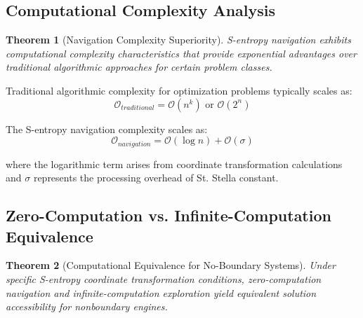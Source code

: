 \documentclass[11pt,a4paper]{article}
\newtheorem{theorem}{Theorem}[section]
\theoremstyle{remark}
\begin{document}
\subsection{Computational Complexity Analysis}

\begin{theorem}[Navigation Complexity Superiority]
S-entropy navigation exhibits computational complexity characteristics that provide exponential advantages over traditional algorithmic approaches for certain problem classes.
\end{theorem}

Traditional algorithmic complexity for optimization problems typically scales as:
\begin{equation}
\mathcal{O}_{traditional} = \mathcal{O}(n^k) \text{ or } \mathcal{O}(2^n)
\end{equation}

The S-entropy navigation complexity scales as:
\begin{equation}
\mathcal{O}_{navigation} = \mathcal{O}(\log n) + \mathcal{O}(\sigma)
\label{eq:navigation_complexity}
\end{equation}

where the logarithmic term arises from coordinate transformation calculations and $\sigma$ represents the processing overhead of St. Stella constant.

\subsection{Zero-Computation vs. Infinite-Computation Equivalence}

\begin{theorem}[Computational Equivalence for No-Boundary Systems]
Under specific S-entropy coordinate transformation conditions, zero-computation navigation and infinite-computation exploration yield equivalent solution accessibility for nonboundary engines.
\end{theorem}
\end{document}
